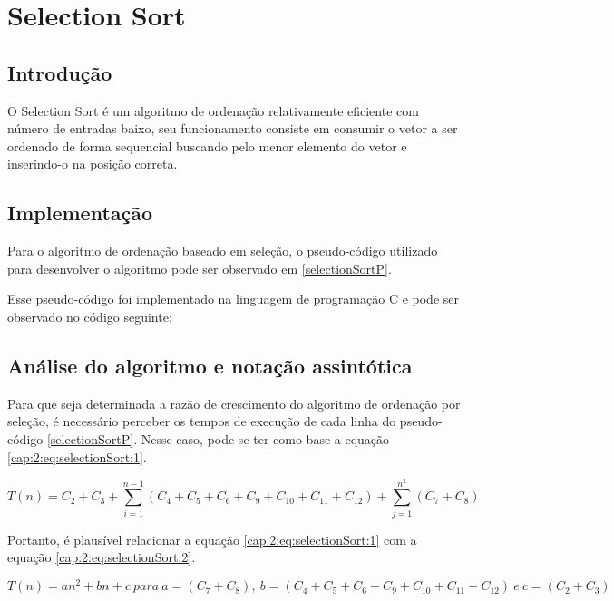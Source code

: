 \section{Selection Sort} \label{cap:2:section:ssort}

\subsection{Introdução}

O Selection Sort é um algoritmo de ordenação relativamente eficiente com número de entradas baixo,
seu funcionamento consiste em consumir o vetor a ser ordenado de forma sequencial buscando pelo menor
elemento do vetor e inserindo-o na posição correta.

\subsection{Implementação}

Para o algoritmo de ordenação baseado em seleção, o pseudo-código utilizado para desenvolver o
algoritmo pode ser observado em \ref{selectionSortP}.



Esse pseudo-código foi implementado na linguagem de programação C 
e pode ser observado no código seguinte:



\subsection{Análise do algoritmo e notação assintótica}

Para que seja determinada a razão de crescimento do algoritmo de ordenação por seleção, é necessário
perceber os tempos de execução de cada linha do pseudo-código \ref{selectionSortP}.
Nesse caso, pode-se ter como base a equação \ref{cap:2:eq:selectionSort:1}.

\begin{equation} \label{cap:2:eq:selectionSort:1}
    T(n) = C_2 + C_3 + \sum_{i=1}^{n - 1}(C_4 + C_5 + C_6 + C_9 + C_{10} + C_{11} + C_{12}) + \sum_{j=1}^{n^2}(C_7 + C_8) 
\end{equation}

Portanto, é plausível relacionar a equação \ref{cap:2:eq:selectionSort:1} com a equação \ref{cap:2:eq:selectionSort:2}.

\begin{equation} \label{cap:2:eq:selectionSort:2}
    T(n) = an^2 + bn + c \  para\  a = (C_7 + C_8),\  b = (C_4 + C_5 + C_6 + C_9 + C_{10} + C_{11} + C_{12})\  e\  c = (C_2 + C_3)
\end{equation}

